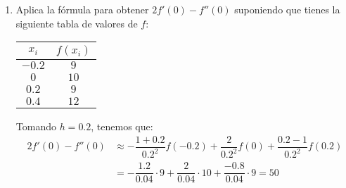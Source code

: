 \begin{ejercicio}
\begin{enumerate}
        \item Aplica la fórmula para obtener $2f'(0) - f''(0)$ suponiendo que tienes la siguiente tabla de valores de $f$:
        \begin{center}
            \begin{tabular}{c|c}
                $x_i$ & $f(x_i)$ \\
                \hline
                $-0.2$ & $9$ \\
                $0$ & $10$ \\
                $0.2$ & $9$ \\
                $0.4$ & $12$
            \end{tabular}
        \end{center}

        Tomando $h=0.2$, tenemos que:
        \begin{align*}
            2f'(0) - f''(0) &\approx -\dfrac{1+0.2}{0.2^2}f(-0.2) + \dfrac{2}{0.2^2}f(0) + \dfrac{0.2-1}{0.2^2}f(0.2)\\
            &= -\dfrac{1.2}{0.04}\cdot 9 + \dfrac{2}{0.04}\cdot 10 + \dfrac{-0.8}{0.04}\cdot 9 = 50
        \end{align*}
    \end{enumerate}
\end{ejercicio}

